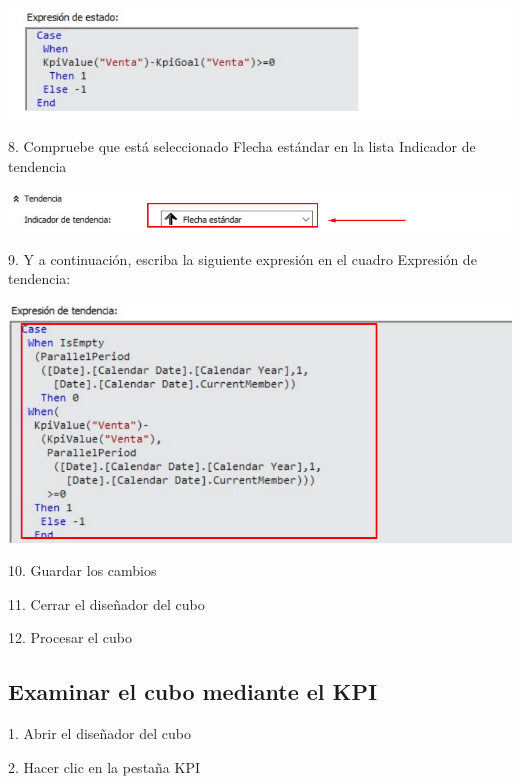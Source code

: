 	\begin{center}
	\includegraphics[width=\columnwidth]{images/task8/img7}
	\end{center}	


8. Compruebe que está seleccionado Flecha estándar en la lista Indicador de tendencia

	\begin{center}
	\includegraphics[width=\columnwidth]{images/task8/img8}
	\end{center}	

9. Y a continuación, escriba la siguiente expresión en el cuadro Expresión de tendencia:

	\begin{center}
	\includegraphics[width=\columnwidth]{images/task8/img9}
	\end{center}	


10. Guardar los cambios

11. Cerrar el diseñador del cubo

12. Procesar el cubo

\subsection{Examinar el cubo mediante el KPI}

1. Abrir el diseñador del cubo

2. Hacer clic en la pestaña KPI

